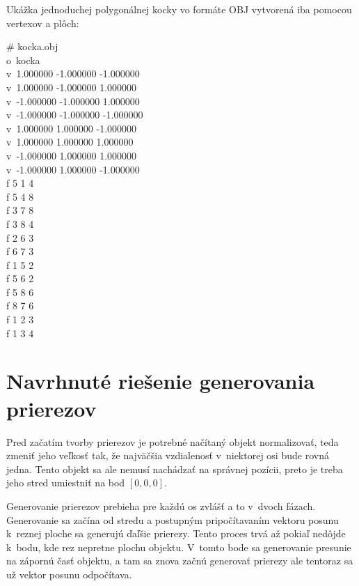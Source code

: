 \pagebreak
Ukážka jednoduchej polygonálnej kocky vo formáte OBJ vytvorená iba pomocou vertexov a plôch:
\begin{framed}
{
\noindent
\# kocka.obj \\
o~kocka \\
v~1.000000 -1.000000 -1.000000\\
v~1.000000 -1.000000 1.000000\\
v~-1.000000 -1.000000 1.000000\\
v~-1.000000 -1.000000 -1.000000\\
v~1.000000 1.000000 -1.000000\\
v~1.000000 1.000000 1.000000\\
v~-1.000000 1.000000 1.000000\\
v~-1.000000 1.000000 -1.000000\\
f 5 1 4\\
f 5 4 8\\
f 3 7 8\\
f 3 8 4\\
f 2 6 3\\
f 6 7 3\\
f 1 5 2\\
f 5 6 2\\
f 5 8 6\\
f 8 7 6\\
f 1 2 3\\
f 1 3 4
}
\end{framed}

\chapter{Navrhnuté riešenie generovania prierezov}
Pred začatím tvorby prierezov je potrebné načítaný objekt normalizovať, teda zmeniť jeho veľkosť tak, že najväčšia vzdialenosť v~niektorej osi bude rovná jedna.
Tento objekt sa ale nemusí nachádzať na správnej pozícii, preto je treba jeho stred umiestniť na bod $[0,0,0]$.

Generovanie prierezov prebieha pre každú os zvlášť a to v~dvoch fázach. Generovanie sa začína od stredu a postupným pripočítavaním vektoru posunu k~reznej ploche sa generujú ďaľšie prierezy. Tento proces trvá až pokiaľ nedôjde k~bodu, kde rez nepretne plochu objektu. V~tomto bode sa generovanie presunie na zápornú časť objektu, a tam sa znova začnú generovať prierezy ale tentoraz sa už vektor posunu odpočítava.


